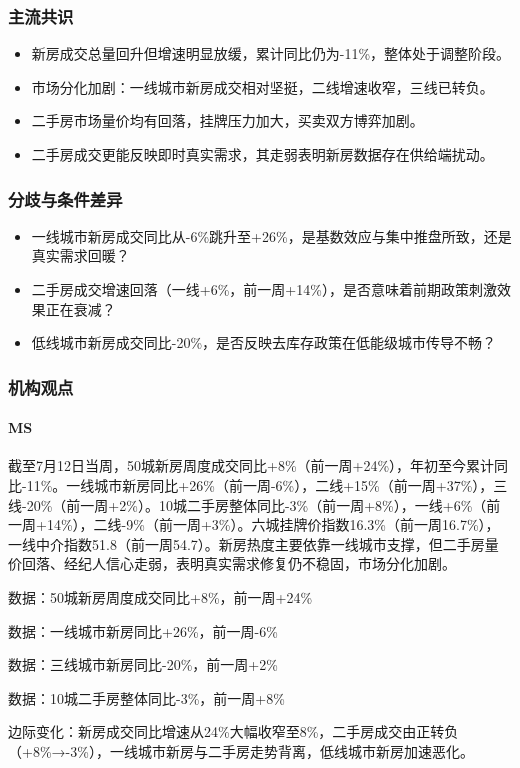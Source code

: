 \documentclass[11pt]{ctexart}
\begin{document}
\subsubsection*{主流共识}
\begin{itemize}
  \item 新房成交总量回升但增速明显放缓，累计同比仍为-11\%，整体处于调整阶段。
  \item 市场分化加剧：一线城市新房成交相对坚挺，二线增速收窄，三线已转负。
  \item 二手房市场量价均有回落，挂牌压力加大，买卖双方博弈加剧。
  \item 二手房成交更能反映即时真实需求，其走弱表明新房数据存在供给端扰动。
\end{itemize}
\subsubsection*{分歧与条件差异}
\begin{itemize}
  \item 一线城市新房成交同比从-6\%跳升至+26\%，是基数效应与集中推盘所致，还是真实需求回暖？
  \item 二手房成交增速回落（一线+6\%，前一周+14\%），是否意味着前期政策刺激效果正在衰减？
  \item 低线城市新房成交同比-20\%，是否反映去库存政策在低能级城市传导不畅？
\end{itemize}
\subsubsection*{机构观点}
\paragraph{MS} 截至7月12日当周，50城新房周度成交同比+8\%（前一周+24\%），年初至今累计同比-11\%。一线城市新房同比+26\%（前一周-6\%），二线+15\%（前一周+37\%），三线-20\%（前一周+2\%）。10城二手房整体同比-3\%（前一周+8\%），一线+6\%（前一周+14\%），二线-9\%（前一周+3\%）。六城挂牌价指数16.3\%（前一周16.7\%），一线中介指数51.8（前一周54.7）。新房热度主要依靠一线城市支撑，但二手房量价回落、经纪人信心走弱，表明真实需求修复仍不稳固，市场分化加剧。
{\small\color{refgray}数据：50城新房周度成交同比+8\%，前一周+24\%\par}
{\small\color{refgray}数据：一线城市新房同比+26\%，前一周-6\%\par}
{\small\color{refgray}数据：三线城市新房同比-20\%，前一周+2\%\par}
{\small\color{refgray}数据：10城二手房整体同比-3\%，前一周+8\%\par}
{\small\color{refgray}边际变化：新房成交同比增速从24\%大幅收窄至8\%，二手房成交由正转负（+8\%→-3\%），一线城市新房与二手房走势背离，低线城市新房加速恶化。\par}
\end{document}
